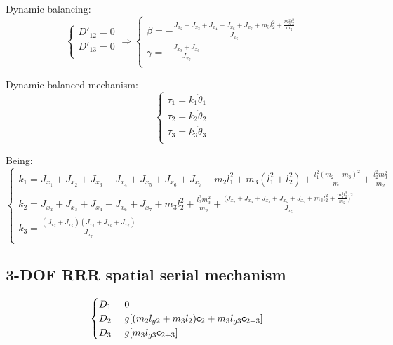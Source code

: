 \documentclass[a4paper,11pt,brazil,fleqn]{article}
\begin{document}
Dynamic balancing:
\begin{equation}
\begin{cases}
D'_{12} = 0 \\
D'_{13} = 0 \\
\end{cases}
\Rightarrow
\begin{cases}
\beta = -\frac{J_{x_2} + J_{x_3} + J_{x_4} + J_{x_6} + J_{x_7} + m_3 l_2^2 + \frac{m_3^2 l_2^2}{m_2}}{J_{x_5}} \\
\gamma = -\frac{J_{x_3} + J_{x_6}}{J_{x_7}} \\
\end{cases}
\end{equation}

Dynamic balanced mechanism:
\begin{equation}
\begin{cases}
\tau_1 = k_1 \ddot{\theta}_1 \\
\tau_2 = k_2 \ddot{\theta}_2 \\
\tau_3 = k_3 \ddot{\theta}_3 \\
\end{cases}
\end{equation}

Being:
\begin{equation}
\begin{cases}
k_1 = J_{x_1} + J_{x_2} + J_{x_3} + J_{x_4} + J_{x_5} + J_{x_6} + J_{x_7} + m_2 l_1^2 + m_3 (l_1^2 + l_2^2) + \frac{l_1^2 (m_2 + m_3)^2}{m_1} + \frac{l_2^2 m_3^2}{m_2} \\
k_2 = J_{x_2} + J_{x_3} + J_{x_4} + J_{x_6} + J_{x_7} + m_3 l_2^2 + \frac{l_2^2 m_3^2}{m_2} + \frac{\big(J_{x_2} + J_{x_3} + J_{x_4} + J_{x_6} + J_{x_7} + m_3 l_2^2 + \frac{m_3^2 l_2^2}{m_2}\big)^2}{J_{x_5}} \\
k_3 = \frac{(J_{x_3}+J_{x_6})(J_{x_3}+J_{x_6}+J_{x_7})}{J_{x_7}} \\
\end{cases}
\end{equation}

\subsection{3-DOF RRR spatial serial mechanism} \label{S03-2}

\begin{equation}
\begin{cases}
D_1 = 0 \\
D_2 = g[ (m_2 l_{g2} + m_3 l_2  ) \mathsf{c}_2 + m_3 l_{g3} \mathsf{c}_{2+3} ]  \\
D_3 = g[ m_3 l_{g3} \mathsf{c}_{2+3}  ] \\
\end{cases}
\end{equation} 
\end{document}
